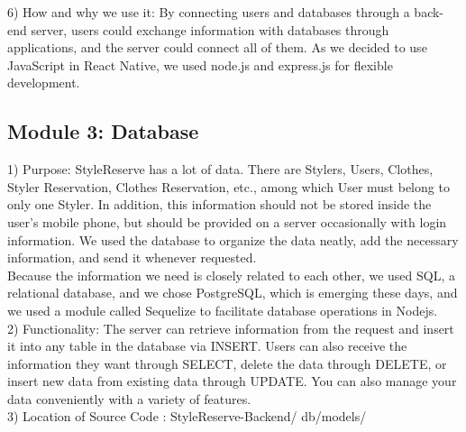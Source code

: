 \documentclass[conference]{IEEEtran}
\begin{document}
6) How and why we use it: By connecting users and databases through a back-end server, users could exchange information with databases through applications, and the server could connect all of them. As we decided to use JavaScript in React Native, we used node.js and express.js for flexible development.\\

\subsection{Module 3: Database}
1) Purpose: StyleReserve has a lot of data. There are Stylers, Users, Clothes, Styler Reservation, Clothes Reservation, etc., among which User must belong to only one Styler. In addition, this information should not be stored inside the user's mobile phone, but should be provided on a server occasionally with login information. We used the database to organize the data neatly, add the necessary information, and send it whenever requested.\\
Because the information we need is closely related to each other, we used SQL, a relational database, and we chose PostgreSQL, which is emerging these days, and we used a module called Sequelize to facilitate database operations in Nodejs.\\

2) Functionality: The server can retrieve information from the request and insert it into any table in the database via INSERT. Users can also receive the information they want through SELECT, delete the data through DELETE, or insert new data from existing data through UPDATE. You can also manage your data conveniently with a variety of features.\\

3) Location of Source Code : StyleReserve-Backend/ db/models/\\
\end{document}
